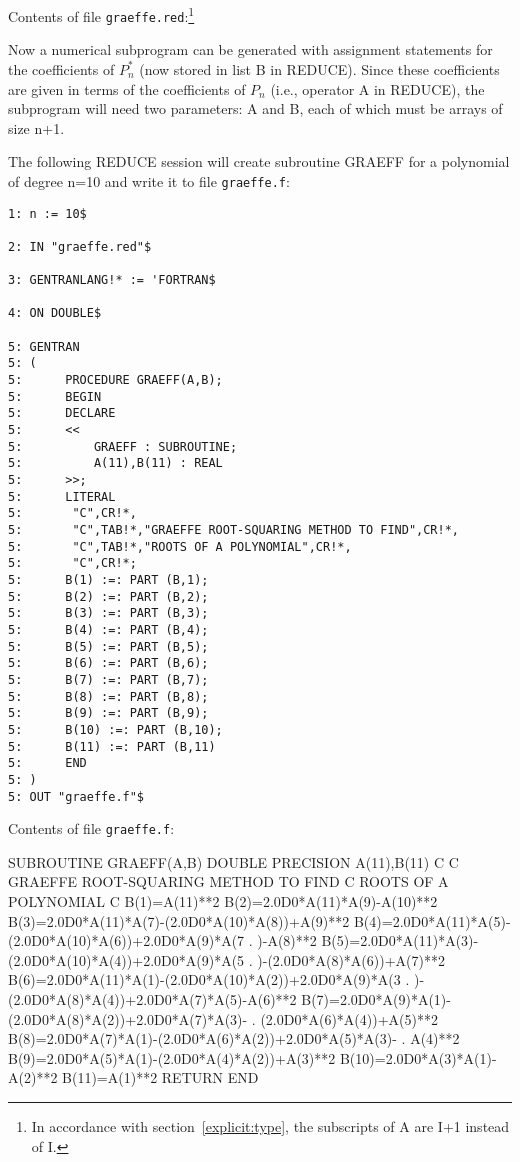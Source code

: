 Contents of file {\tt graeffe.red}:\footnote{
In accordance with section~\ref{explicit:type},
the subscripts of A are I+1 instead of I.}

Now a numerical subprogram can be generated with assignment
statements for the coefficients of $P^{*}_n$ (now stored in list B in
REDUCE).  Since these coefficients are given in terms of the coefficients
of $P_n$ (i.e., operator A in REDUCE), the subprogram will need two
parameters:  A and B, each of which must be arrays of size n+1.

The following REDUCE session will create subroutine GRAEFF for a polynomial
of degree n=10 and write it to file {\tt graeffe.f}:
{\small
\begin{verbatim}
1: n := 10$

2: IN "graeffe.red"$

3: GENTRANLANG!* := 'FORTRAN$

4: ON DOUBLE$

5: GENTRAN
5: (
5:      PROCEDURE GRAEFF(A,B);
5:      BEGIN
5:      DECLARE
5:      <<
5:          GRAEFF : SUBROUTINE;
5:          A(11),B(11) : REAL
5:      >>;
5:      LITERAL
5:       "C",CR!*,
5:       "C",TAB!*,"GRAEFFE ROOT-SQUARING METHOD TO FIND",CR!*,
5:       "C",TAB!*,"ROOTS OF A POLYNOMIAL",CR!*,
5:       "C",CR!*;
5:      B(1) :=: PART (B,1);
5:      B(2) :=: PART (B,2);
5:      B(3) :=: PART (B,3);
5:      B(4) :=: PART (B,4);
5:      B(5) :=: PART (B,5);
5:      B(6) :=: PART (B,6);
5:      B(7) :=: PART (B,7);
5:      B(8) :=: PART (B,8);
5:      B(9) :=: PART (B,9);
5:      B(10) :=: PART (B,10);
5:      B(11) :=: PART (B,11)
5:      END
5: )
5: OUT "graeffe.f"$
\end{verbatim}
}

Contents of file {\tt graeffe.f}:
\begin{framedverbatim}
      SUBROUTINE GRAEFF(A,B)
      DOUBLE PRECISION A(11),B(11)
C
C     GRAEFFE ROOT-SQUARING METHOD TO FIND
C     ROOTS OF A POLYNOMIAL
C
      B(1)=A(11)**2
      B(2)=2.0D0*A(11)*A(9)-A(10)**2
      B(3)=2.0D0*A(11)*A(7)-(2.0D0*A(10)*A(8))+A(9)**2
      B(4)=2.0D0*A(11)*A(5)-(2.0D0*A(10)*A(6))+2.0D0*A(9)*A(7
     . )-A(8)**2
      B(5)=2.0D0*A(11)*A(3)-(2.0D0*A(10)*A(4))+2.0D0*A(9)*A(5
     . )-(2.0D0*A(8)*A(6))+A(7)**2
      B(6)=2.0D0*A(11)*A(1)-(2.0D0*A(10)*A(2))+2.0D0*A(9)*A(3
     . )-(2.0D0*A(8)*A(4))+2.0D0*A(7)*A(5)-A(6)**2
      B(7)=2.0D0*A(9)*A(1)-(2.0D0*A(8)*A(2))+2.0D0*A(7)*A(3)-
     . (2.0D0*A(6)*A(4))+A(5)**2
      B(8)=2.0D0*A(7)*A(1)-(2.0D0*A(6)*A(2))+2.0D0*A(5)*A(3)-
     . A(4)**2
      B(9)=2.0D0*A(5)*A(1)-(2.0D0*A(4)*A(2))+A(3)**2
      B(10)=2.0D0*A(3)*A(1)-A(2)**2
      B(11)=A(1)**2
      RETURN
      END
\end{framedverbatim}

